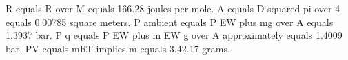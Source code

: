 R equals R over M equals 166.28 joules per mole. A equals D squared pi over 4 equals 0.00785 square meters. P ambient equals P EW plus mg over A equals 1.3937 bar. P q equals P EW plus m EW g over A approximately equals 1.4009 bar. PV equals mRT implies m equals 3.42.17 grams.